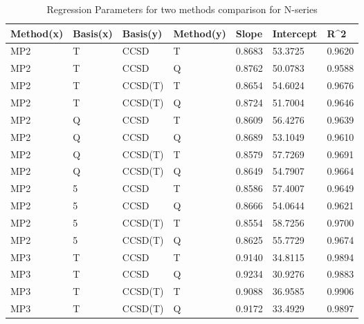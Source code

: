 \begin{table}
  \caption{Regression Parameters for two methods comparison for N-series}
  \label{tbl:regression-two-n}
  \begin{tabular}{l l l l l l l }
    \hline
    Method(x) & Basis(x) & Basis(y) & Method(y) & Slope & Intercept & R^2 \\ 
    \hline
    MP2 & T & CCSD & T & 0.8683 & 53.3725 & 0.9620 \\ 
    MP2 & T & CCSD & Q & 0.8762 & 50.0783 & 0.9588 \\ 
    MP2 & T & CCSD(T) & T & 0.8654 & 54.6024 & 0.9676 \\ 
    MP2 & T & CCSD(T) & Q & 0.8724 & 51.7004 & 0.9646 \\ 
    MP2 & Q & CCSD & T & 0.8609 & 56.4276 & 0.9639 \\ 
    MP2 & Q & CCSD & Q & 0.8689 & 53.1049 & 0.9610 \\ 
    MP2 & Q & CCSD(T) & T & 0.8579 & 57.7269 & 0.9691 \\ 
    MP2 & Q & CCSD(T) & Q & 0.8649 & 54.7907 & 0.9664 \\ 
    MP2 & 5 & CCSD & T & 0.8586 & 57.4007 & 0.9649 \\ 
    MP2 & 5 & CCSD & Q & 0.8666 & 54.0644 & 0.9621 \\ 
    MP2 & 5 & CCSD(T) & T & 0.8554 & 58.7256 & 0.9700 \\ 
    MP2 & 5 & CCSD(T) & Q & 0.8625 & 55.7729 & 0.9674 \\ 
    MP3 & T & CCSD & T & 0.9140 & 34.8115 & 0.9894 \\ 
    MP3 & T & CCSD & Q & 0.9234 & 30.9276 & 0.9883 \\ 
    MP3 & T & CCSD(T) & T & 0.9088 & 36.9585 & 0.9906 \\ 
    MP3 & T & CCSD(T) & Q & 0.9172 & 33.4929 & 0.9897 \\ 
    \hline
  \end{tabular}
\end{table}
